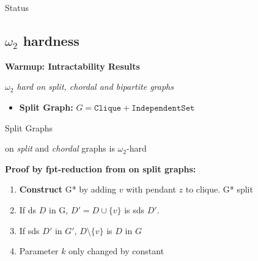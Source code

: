\begin{frame}[c]{Status \sdom}
 \begin{figure}
    \centering

    \makeatletter
    \resizebox{0.7\textwidth}{!}{
        
    }
    \makeatother
\end{figure}
\end{frame}

\subsection{$\omega_2$ hardness}
\begin{frame}[c]{}
    \begin{center}
        \textbf{Warmup: Intractability Results}

        \textit{$\omega_2$ hard on split, chordal and bipartite graphs}
    \end{center}

    \begin{itemize}
        \item \textbf{Split Graph:} $G = \mathtt{Clique} + \mathtt{Independent Set}$
    \end{itemize}

\end{frame}

\begin{frame}[c]{Split Graphs}

    \begin{tcolorbox}[colback=TUMBlueLighter]
        \sdom on \textit{split} and \textit{chordal} graphs is $\omega_2$-hard
    \end{tcolorbox}

    \begin{figure}[!ht]
    \end{figure}

    \textbf{Proof by  fpt-reduction from \pdom on split graphs:}

    \begin{enumerate}
      \pause  \item \textbf{Construct } G* by adding $v$ with pendant $z$ to clique. G* split
      \pause  \item If ds $D$ in G, $D' = D \cup \{v\}$ is sds $D'$.
      \pause  \item If sds $D'$ in $G'$, $D \setminus \{v\}$ is $D$ in $G$ 
      \pause  \item Parameter $k$ only changed by constant
    \end{enumerate}

\end{frame}

